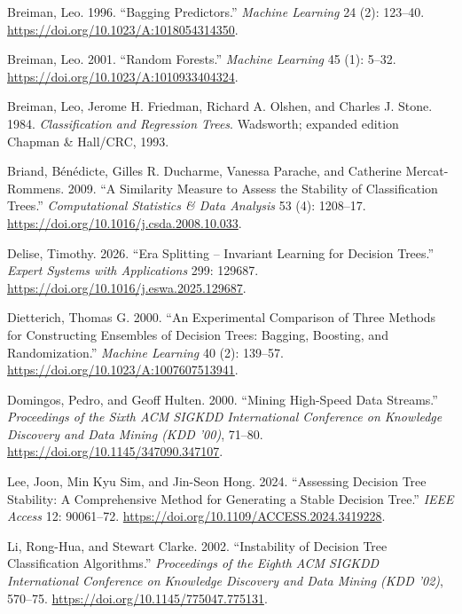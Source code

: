 \documentclass[
  conference]{IEEEtran}
\newlength{\cslhangindent}
\newenvironment{CSLReferences}[2] %
 {\begin{list}{}{%
  \setlength{\itemindent}{0pt}
  \setlength{\leftmargin}{0pt}
  \setlength{\parsep}{0pt}
  \ifodd #1
   \setlength{\leftmargin}{\cslhangindent}
   \setlength{\itemindent}{-1\cslhangindent}
  \fi
  \setlength{\itemsep}{#2\baselineskip}}}
 {\end{list}}
\begin{document}
\protect{}\label{refs}
\begin{CSLReferences}{1}{1}
Breiman, Leo. 1996. {``Bagging Predictors.''} \emph{Machine Learning} 24
(2): 123--40. \url{https://doi.org/10.1023/A:1018054314350}.

Breiman, Leo. 2001. {``Random Forests.''} \emph{Machine Learning} 45
(1): 5--32. \url{https://doi.org/10.1023/A:1010933404324}.

Breiman, Leo, Jerome H. Friedman, Richard A. Olshen, and Charles J.
Stone. 1984. \emph{Classification and Regression Trees}. Wadsworth;
expanded edition Chapman \& Hall/CRC, 1993.

Briand, Bénédicte, Gilles R. Ducharme, Vanessa Parache, and Catherine
Mercat-Rommens. 2009. {``A Similarity Measure to Assess the Stability of
Classification Trees.''} \emph{Computational Statistics \& Data
Analysis} 53 (4): 1208--17.
\url{https://doi.org/10.1016/j.csda.2008.10.033}.

Delise, Timothy. 2026. {``Era Splitting -- Invariant Learning for
Decision Trees.''} \emph{Expert Systems with Applications} 299: 129687.
\url{https://doi.org/10.1016/j.eswa.2025.129687}.

Dietterich, Thomas G. 2000. {``An Experimental Comparison of Three
Methods for Constructing Ensembles of Decision Trees: Bagging, Boosting,
and Randomization.''} \emph{Machine Learning} 40 (2): 139--57.
\url{https://doi.org/10.1023/A:1007607513941}.

Domingos, Pedro, and Geoff Hulten. 2000. {``Mining High-Speed Data
Streams.''} \emph{Proceedings of the Sixth ACM SIGKDD International
Conference on Knowledge Discovery and Data Mining (KDD '00)}, 71--80.
\url{https://doi.org/10.1145/347090.347107}.

Lee, Joon, Min Kyu Sim, and Jin-Seon Hong. 2024. {``Assessing Decision
Tree Stability: A Comprehensive Method for Generating a Stable Decision
Tree.''} \emph{IEEE Access} 12: 90061--72.
\url{https://doi.org/10.1109/ACCESS.2024.3419228}.

Li, Rong-Hua, and Stewart Clarke. 2002. {``Instability of Decision Tree
Classification Algorithms.''} \emph{Proceedings of the Eighth ACM SIGKDD
International Conference on Knowledge Discovery and Data Mining (KDD
'02)}, 570--75. \url{https://doi.org/10.1145/775047.775131}.


\end{CSLReferences}
\end{document}
